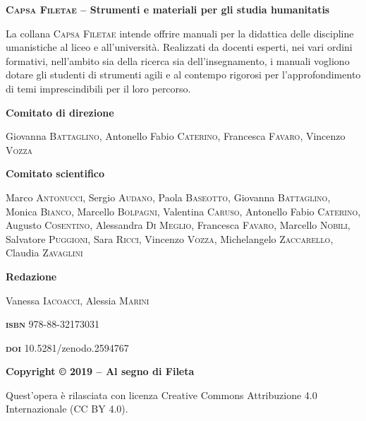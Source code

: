 \thispagestyle{empty}

\setlength{\parindent}{0pt}
\textbf{\textsc{\large{Capsa Filetae}} -- Strumenti e materiali per gli studia humanitatis}

La collana \textsc{Capsa Filetae} intende offrire manuali per la
didattica delle discipline umanistiche al liceo e all'università.
Realizzati da docenti esperti, nei vari ordini formativi, nell'ambito
sia della ricerca sia dell'insegnamento, i manuali vogliono dotare gli
studenti di strumenti agili e al contempo rigorosi per l'approfondimento
di temi imprescindibili per il loro percorso.

\vspace{2em}

\textbf{Comitato di direzione}

Giovanna \textsc{Battaglino}, Antonello Fabio \textsc{Caterino}, 
Francesca \textsc{Favaro}, Vincenzo \textsc{Vozza}

\vspace{2em}

\textbf{Comitato scientifico}

Marco \textsc{Antonucci}, Sergio \textsc{Audano,} Paola
\textsc{Baseotto}, Giovanna \textsc{Battaglino}, Monica \textsc{Bianco},
Marcello \textsc{Bolpagni}, Valentina \textsc{Caruso}, Antonello Fabio 
\textsc{Caterino}, Augusto \textsc{Cosentino}, Alessandra \textsc{Di}
\textsc{Meglio}, Francesca \textsc{Favaro}, Marcello \textsc{Nobili},
Salvatore \textsc{Puggioni}, Sara \textsc{Ricci}, Vincenzo
\textsc{Vozza}, Michelangelo \textsc{Zaccarello}, Claudia
\textsc{Zavaglini}


\vspace{2em}

\textbf{Redazione}

Vanessa \textsc{Iacoacci}, Alessia \textsc{Marini}


\vspace{2em}

\textbf{\textsc{isbn}} 978-88-32173031

\textbf{\textsc{doi}} 10.5281/zenodo.2594767

\vspace{1em}
\textbf{Copyright © 2019 -- Al segno di Fileta}

Quest'opera è rilasciata con licenza Creative Commons Attribuzione 4.0 Internazionale (CC BY 4.0). 



\setlength{\parindent}{1em}


{
\setcounter{tocdepth}{0}
\tableofcontents
}

